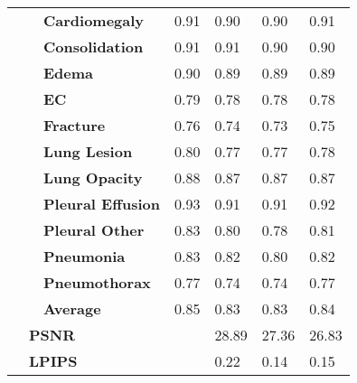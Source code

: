 \begin{table}[]
\begin{tabular}{cll|llll}
                                 &                        & \textbf{Cardiomegaly} & 0.91 & 0.90 & 0.90 & 0.91 \\
                                 &                        & \textbf{Consolidation} & 0.91 & 0.91 & 0.90 & 0.90 \\ 
                                 &                        & \textbf{Edema} & 0.90 & 0.89 & 0.89 & 0.89 \\ 
                                 &                        & \textbf{EC} & 0.79 & 0.78 & 0.78 & 0.78 \\ 
                                 &                        & \textbf{Fracture} & 0.76 & 0.74 & 0.73 & 0.75 \\ 
                                 &                        & \textbf{Lung Lesion} & 0.80 & 0.77 & 0.77 & 0.78 \\ 
                                 &                        & \textbf{Lung Opacity} & 0.88 & 0.87 & 0.87 & 0.87 \\ 
                                 &                        & \textbf{Pleural Effusion} & 0.93 & 0.91 & 0.91 & 0.92 \\ 
                                 &                        & \textbf{Pleural Other} & 0.83 & 0.80 & 0.78 & 0.81 \\ 
                                 &                        & \textbf{Pneumonia} & 0.83 & 0.82 & 0.80 & 0.82 \\ 
                                 &                        & \textbf{Pneumothorax} & 0.77 & 0.74 & 0.74 & 0.77 \\
                                 &                        & \textbf{Average} & 0.85 & 0.83 & 0.83 & 0.84 \\ \cline{2-3}
                                 & \multicolumn{2}{l|}{\textbf{PSNR}}            & \cellcolor[HTML]{C0C0C0} & 28.89 & 27.36 & 26.83 \\
                                 & \multicolumn{2}{l|}{\textbf{LPIPS}}           & \cellcolor[HTML]{C0C0C0} & 0.22 & 0.14 & 0.15 \\ \hline
\end{tabular}
\end{table}